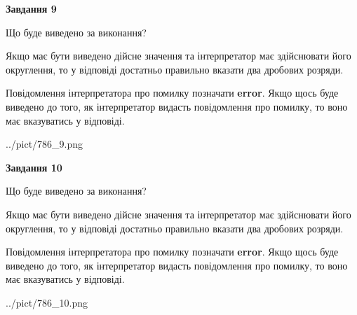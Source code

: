 \documentclass[12pt, ukrainian]{article}
\begin{document}
{\begin {Large}
{\begin {center}\textbf{Завдання 9}\end {center}}\par
Що буде виведено за виконання? \par

Якщо має бути виведено дійсне значення та інтерпретатор має здійснювати його округлення, 
то у відповіді достатньо правильно вказати два дробових розряди.

Повідомлення інтерпретатора про помилку позначати \textbf{error}.
Якщо щось буде виведено до того, як інтерпретатор видасть повідомлення про помилку, 
то воно має вказуватись у відповіді. \par

\begin{center}
	{../pict/786_9.png}
\end{center}
\newpage

{\begin {center}\textbf{Завдання 10}\end {center}}\par
Що буде виведено за виконання? \par

Якщо має бути виведено дійсне значення та інтерпретатор має здійснювати його округлення, 
то у відповіді достатньо правильно вказати два дробових розряди.

Повідомлення інтерпретатора про помилку позначати \textbf{error}.
Якщо щось буде виведено до того, як інтерпретатор видасть повідомлення про помилку, 
то воно має вказуватись у відповіді. \par

\begin{center}
	{../pict/786_10.png}
\end{center}
\newpage

\end {Large}}
\end{document}
